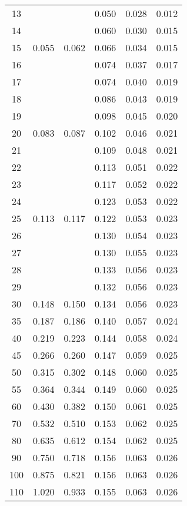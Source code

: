 \begin{table}[H]
\begin{tabular}{c||c|c|c|c|c}
      13	&       &       & 0.050	& 0.028	& 0.012 \\
      14	&       &       & 0.060	& 0.030	& 0.015 \\
      15	& 0.055 & 0.062 & 0.066	& 0.034	& 0.015 \\
      16	&       &       & 0.074	& 0.037	& 0.017 \\
      17	&       &       & 0.074	& 0.040	& 0.019 \\
      18	&       &       & 0.086	& 0.043	& 0.019 \\
      19	&       &       & 0.098	& 0.045	& 0.020 \\
      20	& 0.083 & 0.087 & 0.102	& 0.046	& 0.021 \\
      21	&       &       & 0.109	& 0.048	& 0.021 \\
      22	&       &       & 0.113	& 0.051	& 0.022 \\
      23	&       &       & 0.117	& 0.052	& 0.022 \\
      24	&       &       & 0.123	& 0.053	& 0.022 \\
      25	& 0.113 & 0.117 & 0.122	& 0.053	& 0.023 \\
      26	&       &       & 0.130	& 0.054	& 0.023 \\
      27	&       &       & 0.130	& 0.055	& 0.023 \\
      28	&       &       & 0.133	& 0.056	& 0.023 \\
      29	&       &       & 0.132	& 0.056	& 0.023 \\
      30	& 0.148 & 0.150 & 0.134	& 0.056	& 0.023 \\
      35	& 0.187 & 0.186 & 0.140	& 0.057	& 0.024 \\
      40	& 0.219 & 0.223 & 0.144	& 0.058	& 0.024 \\
      45	& 0.266 & 0.260 & 0.147	& 0.059	& 0.025 \\
      50	& 0.315 & 0.302 & 0.148	& 0.060	& 0.025 \\
      55	& 0.364 & 0.344 & 0.149	& 0.060	& 0.025 \\
      60	& 0.430 & 0.382 & 0.150	& 0.061	& 0.025 \\
      70	& 0.532 & 0.510 & 0.153	& 0.062	& 0.025 \\
      80	& 0.635 & 0.612 & 0.154	& 0.062	& 0.025 \\
      90	& 0.750 & 0.718 & 0.156	& 0.063	& 0.026 \\
      100	& 0.875 & 0.821 & 0.156	& 0.063	& 0.026 \\
      110	& 1.020 & 0.933 & 0.155	& 0.063	& 0.026 \\

\end{tabular}
\end{table}
